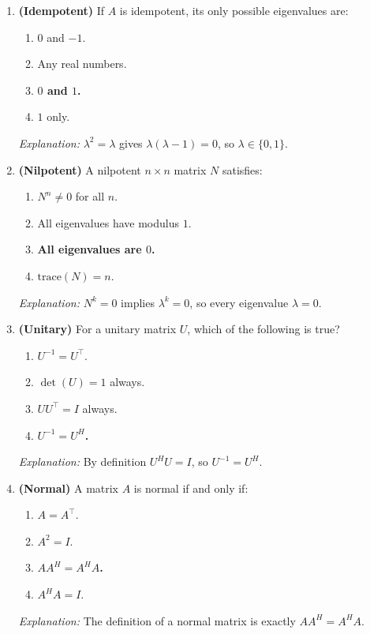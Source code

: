 \documentclass[12pt,a4paper]{article}
\begin{document}
\begin{enumerate}[label=\textbf{MCQ\arabic*.}]
  \item \textbf{(Idempotent)} If $A$ is idempotent, its only possible eigenvalues are:
  \begin{enumerate}[label=(\alph*)]
    \item $0$ and $-1$.
    \item Any real numbers.
    \item \textbf{$0$ and $1$.}
    \item $1$ only.
  \end{enumerate}
  \textit{Explanation:} $\lambda^2 = \lambda$ gives $\lambda(\lambda-1) = 0$, so $\lambda \in \{0, 1\}$.

  \item \textbf{(Nilpotent)} A nilpotent $n\times n$ matrix $N$ satisfies:
  \begin{enumerate}[label=(\alph*)]
    \item $N^n \neq 0$ for all $n$.
    \item All eigenvalues have modulus $1$.
    \item \textbf{All eigenvalues are $0$.}
    \item $\text{trace}(N) = n$.
  \end{enumerate}
  \textit{Explanation:} $N^k = 0$ implies $\lambda^k = 0$, so every eigenvalue $\lambda = 0$.

  \item \textbf{(Unitary)} For a unitary matrix $U$, which of the following is true?
  \begin{enumerate}[label=(\alph*)]
    \item $U^{-1} = U^\top$.
    \item $\det(U) = 1$ always.
    \item $UU^\top = I$ always.
    \item \textbf{$U^{-1} = U^H$.}
  \end{enumerate}
  \textit{Explanation:} By definition $U^H U = I$, so $U^{-1} = U^H$.

  \item \textbf{(Normal)} A matrix $A$ is normal if and only if:
  \begin{enumerate}[label=(\alph*)]
    \item $A = A^\top$.
    \item $A^2 = I$.
    \item \textbf{$AA^H = A^H A$.}
    \item $A^H A = I$.
  \end{enumerate}
  \textit{Explanation:} The definition of a normal matrix is exactly $AA^H = A^H A$.
\end{enumerate}
\end{document}
